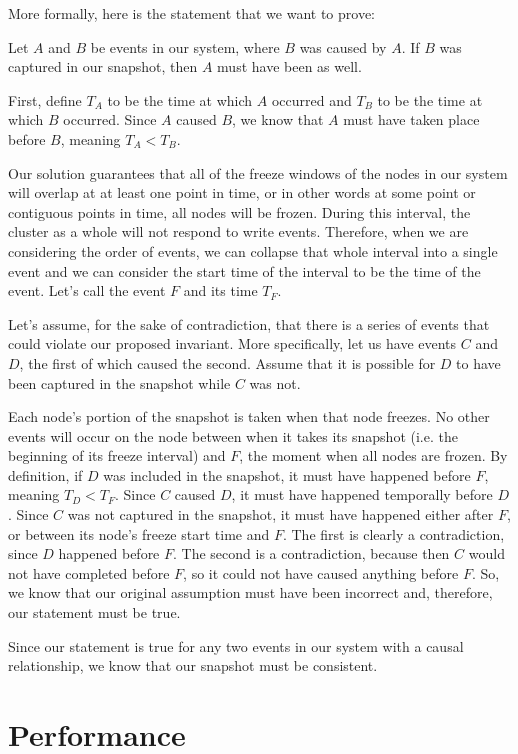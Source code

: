 More formally, here is the statement that we want to prove:

Let $A$ and $B$ be events in our system, where $B$ was caused by
$A$. If $B$ was captured in our snapshot, then $A$ must have been as
well.

First, define $T_A$ to be the time at which $A$ occurred and $T_B$ to
be the time at which $B$ occurred. Since $A$ caused $B$, we know that
$A$ must have taken place before $B$, meaning $T_A < T_B$.

Our solution guarantees that all of the freeze windows of the nodes in
our system will overlap at at least one point in time, or in other
words at some point or contiguous points in time, all nodes will be
frozen.  During this interval, the cluster as a whole will not respond
to write events. Therefore, when we are considering the order of
events, we can collapse that whole interval into a single event and we
can consider the start time of the interval to be the time of the
event. Let’s call the event $F$ and its time $T_F$.

Let’s assume, for the sake of contradiction, that there is a series of
events that could violate our proposed invariant. More specifically,
let us have events $C$ and $D$, the first of which caused the
second. Assume that it is possible for $D$ to have been captured in
the snapshot while $C$ was not.

Each node’s portion of the snapshot is taken when that node
freezes. No other events will occur on the node between when it takes
its snapshot (i.e. the beginning of its freeze interval) and $F$, the
moment when all nodes are frozen. By definition, if $D$ was included
in the snapshot, it must have happened before $F$, meaning $T_D
<T_F$. Since $C$ caused $D$, it must have happened temporally before
$D$.  Since $C$ was not captured in the snapshot, it must have
happened either after $F$, or between its node's freeze start time and
$F$. The first is clearly a contradiction, since $D$ happened before
$F$. The second is a contradiction, because then $C$ would not have
completed before $F$, so it could not have caused anything before
$F$. So, we know that our original assumption must have been incorrect
and, therefore, our statement must be true.

Since our statement is true for any two events in our system with a
causal relationship, we know that our snapshot must be consistent.

\section{Performance}

